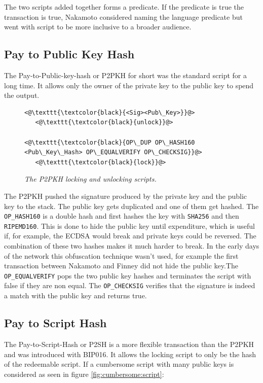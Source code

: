 The two scripts added together forms a predicate. If the predicate is true the transaction is true, Nakamoto considered naming the language predicate but went with script to be more inclusive to a broader audience\cite{nakamoto:predicate}.

\subsection{Pay to Public Key Hash}

The Pay-to-Public-key-hash or P2PKH for short was the standard script for a long time. It allows only the owner of 
the private key to the public key to spend the output.

\begin{figure}[!hbt]
		\centering
	\begin{lstlisting}
<@\texttt{\textcolor{black}{<Sig><Pub\_Key>}}@>   
   <@\texttt{\textcolor{black}{unlock}}@>
   
<@\texttt{\textcolor{black}{OP\_DUP OP\_HASH160 <Pub\_Key\_Hash> OP\_EQUALVERIFY OP\_CHECKSIG}}@>
   <@\texttt{\textcolor{black}{lock}}@>
	\end{lstlisting}
	
	\caption{\textit{ The P2PKH locking and unlocking scripts.
	}}
	\label{fig:P2PKH}
\end{figure}

The P2PKH pushed the signature produced by the private key and the public key to the stack. The public key gets duplicated and one of them get hashed. The \texttt{OP\_HASH160} is a double hash and first hashes the key with \texttt{SHA256} and then \texttt{RIPEMD160}. This is done to hide the public key until expenditure, which is useful if, for example, the ECDSA would break and private keys could be reversed. The combination of these two hashes makes it much harder to break. In the early days of the network this obfuscation technique wasn't used, for example the first transaction between Nakamoto and Finney did not hide the public key\cite{nakamoto:finney:tx}.The \texttt{OP\_EQUALVERIFY} pops the two public key hashes and terminates the script with false if they are non equal. The \texttt{OP\_CHECKSIG} verifies that the signature is indeed a match with the public key and returns true. 

\subsection{Pay to Script Hash}

The Pay-to-Script-Hash or P2SH is a more flexible transaction than the P2PKH and was introduced with BIP016\cite{bip:0016:p2sh}. It allows the locking script to only be the hash of the redeemable script. If a cumbersome script with many public keys is considered as seen in figure \ref{fig:cumbersome:script}:

